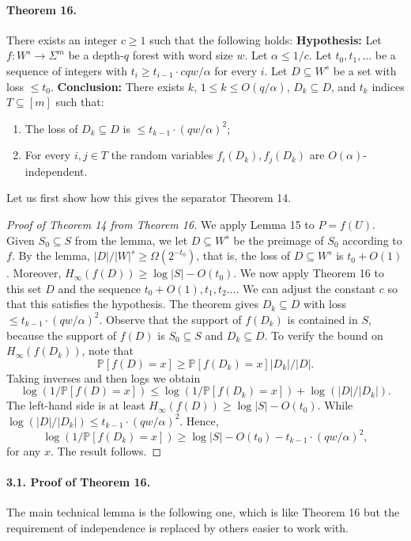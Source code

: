 \documentclass[10pt,a4paper]{article}
\begin{document}
\paragraph{Theorem 16.}
There exists an integer $c\geq1$ such that the following holds:
\textbf{Hypothesis:} Let $f:W^s\to\Sigma^m$ be a depth-$q$ forest with word size $w$. Let $\alpha\leq1/c$. Let $t_0,t_1,\ldots$ be a sequence of integers with $t_i\geq t_{i-1}\cdot cqw/\alpha$ for every $i$. Let $D\subseteq W^s$ be a set with loss $\leq t_0$.
\textbf{Conclusion:} There exists $k$, $1\leq k\leq O(q/\alpha)$, $D_k\subseteq D$, and $t_k$ indices $T\subseteq[m]$ such that:
\begin{enumerate}
\item[(1)] The loss of $D_k\subseteq D$ is $\leq t_{k-1}\cdot(qw/\alpha)^2$;
\item[(2)] For every $i,j\in T$ the random variables $f_i(D_k),f_j(D_k)$ are $O(\alpha)$-independent.
\end{enumerate}
Let us first show how this gives the separator Theorem 14.
\begin{proof}[Proof of Theorem 14 from Theorem 16]
We apply Lemma 15 to $P=f(U)$. Given $S_0\subseteq S$ from the lemma, we let $D\subseteq W^s$ be the preimage of $S_0$ according to $f$. By the lemma, $|D|/|W|^s\geq\Omega(2^{-t_0})$, that is, the loss of $D\subseteq W^s$ is $t_0+O(1)$. Moreover, $H_\infty(f(D))\geq\log|S|-O(t_0)$.
We now apply Theorem 16 to this set $D$ and the sequence $t_0+O(1),t_1,t_2\ldots$. We can adjust the constant $c$ so that this satisfies the hypothesis. The theorem gives $D_k\subseteq D$ with loss $\leq t_{k-1}\cdot(qw/\alpha)^2$.
Observe that the support of $f(D_k)$ is contained in $S$, because the support of $f(D)$ is $S_0\subseteq S$ and $D_k\subseteq D$.
To verify the bound on $H_\infty(f(D_k))$, note that
\[\mathbb P[f(D)=x]\geq\mathbb P[f(D_k)=x]|D_k|/|D|.\]
Taking inverses and then logs we obtain
\[\log(1/\mathbb P[f(D)=x])\leq\log(1/\mathbb P[f(D_k)=x])+\log(|D|/|D_k|).\]
The left-hand side is at least $H_\infty(f(D))\geq\log|S|-O(t_0)$. While $\log(|D|/|D_k|)\leq t_{k-1}\cdot(qw/\alpha)^2$. Hence,
\[\log(1/\mathbb P[f(D_k)=x])\geq\log|S|-O(t_0)-t_{k-1}\cdot(qw/\alpha)^2,\]
for any $x$. The result follows.
\end{proof}
\paragraph{3.1. Proof of Theorem 16.}
The main technical lemma is the following one, which is like Theorem 16 but the requirement of independence is replaced by others easier to work with.
\end{document}
